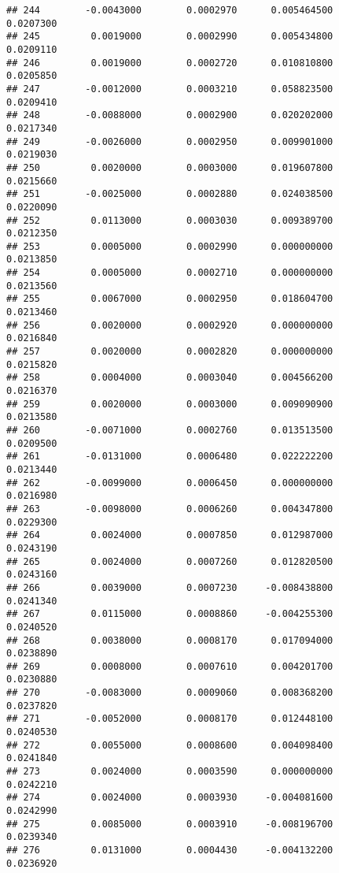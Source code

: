 \documentclass[
]{article}
\begin{document}
\begin{verbatim}
## 244        -0.0043000        0.0002970      0.005464500             0.0207300
## 245         0.0019000        0.0002990      0.005434800             0.0209110
## 246         0.0019000        0.0002720      0.010810800             0.0205850
## 247        -0.0012000        0.0003210      0.058823500             0.0209410
## 248        -0.0088000        0.0002900      0.020202000             0.0217340
## 249        -0.0026000        0.0002950      0.009901000             0.0219030
## 250         0.0020000        0.0003000      0.019607800             0.0215660
## 251        -0.0025000        0.0002880      0.024038500             0.0220090
## 252         0.0113000        0.0003030      0.009389700             0.0212350
## 253         0.0005000        0.0002990      0.000000000             0.0213850
## 254         0.0005000        0.0002710      0.000000000             0.0213560
## 255         0.0067000        0.0002950      0.018604700             0.0213460
## 256         0.0020000        0.0002920      0.000000000             0.0216840
## 257         0.0020000        0.0002820      0.000000000             0.0215820
## 258         0.0004000        0.0003040      0.004566200             0.0216370
## 259         0.0020000        0.0003000      0.009090900             0.0213580
## 260        -0.0071000        0.0002760      0.013513500             0.0209500
## 261        -0.0131000        0.0006480      0.022222200             0.0213440
## 262        -0.0099000        0.0006450      0.000000000             0.0216980
## 263        -0.0098000        0.0006260      0.004347800             0.0229300
## 264         0.0024000        0.0007850      0.012987000             0.0243190
## 265         0.0024000        0.0007260      0.012820500             0.0243160
## 266         0.0039000        0.0007230     -0.008438800             0.0241340
## 267         0.0115000        0.0008860     -0.004255300             0.0240520
## 268         0.0038000        0.0008170      0.017094000             0.0238890
## 269         0.0008000        0.0007610      0.004201700             0.0230880
## 270        -0.0083000        0.0009060      0.008368200             0.0237820
## 271        -0.0052000        0.0008170      0.012448100             0.0240530
## 272         0.0055000        0.0008600      0.004098400             0.0241840
## 273         0.0024000        0.0003590      0.000000000             0.0242210
## 274         0.0024000        0.0003930     -0.004081600             0.0242990
## 275         0.0085000        0.0003910     -0.008196700             0.0239340
## 276         0.0131000        0.0004430     -0.004132200             0.0236920

\end{verbatim}
\end{document}
